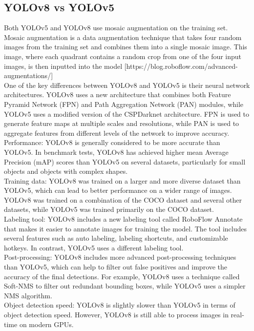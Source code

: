 \documentclass[10pt,twocolumn,letterpaper]{article}
\begin{document}
\subsection{YOLOv8 vs YOLOv5}
Both YOLOv5 and YOLOv8 use mosaic augmentation on the training set. Mosaic augmentation is a data augmentation technique that takes four random images from the training set and combines them into a single mosaic image. This image, where each quadrant contains a random crop from one of the four input images, is then inputted into the model [https://blog.roboflow.com/advanced-augmentations/]\\
One of the key differences between YOLOv8 and YOLOv5 is their neural network architectures. YOLOv8 uses a new architecture that combines both Feature Pyramid Network (FPN) and Path Aggregation Network (PAN) modules, while YOLOv5 uses a modified version of the CSPDarknet architecture. FPN is used to generate feature maps at multiple scales and resolutions, while PAN is used to aggregate features from different levels of the network to improve accuracy.\\
Performance: YOLOv8 is generally considered to be more accurate than YOLOv5. In benchmark tests, YOLOv8 has achieved higher mean Average Precision (mAP) scores than YOLOv5 on several datasets, particularly for small objects and objects with complex shapes.\\
Training data: YOLOv8 was trained on a larger and more diverse dataset than YOLOv5, which can lead to better performance on a wider range of images. YOLOv8 was trained on a combination of the COCO dataset and several other datasets, while YOLOv5 was trained primarily on the COCO dataset.\\
Labeling tool: YOLOv8 includes a new labeling tool called RoboFlow Annotate that makes it easier to annotate images for training the model. The tool includes several features such as auto labeling, labeling shortcuts, and customizable hotkeys. In contrast, YOLOv5 uses a different labeling tool.\\
Post-processing: YOLOv8 includes more advanced post-processing techniques than YOLOv5, which can help to filter out false positives and improve the accuracy of the final detections. For example, YOLOv8 uses a technique called Soft-NMS to filter out redundant bounding boxes, while YOLOv5 uses a simpler NMS algorithm.\\
Object detection speed: YOLOv8 is slightly slower than YOLOv5 in terms of object detection speed. However, YOLOv8 is still able to process images in real-time on modern GPUs.\\
\end{document}

